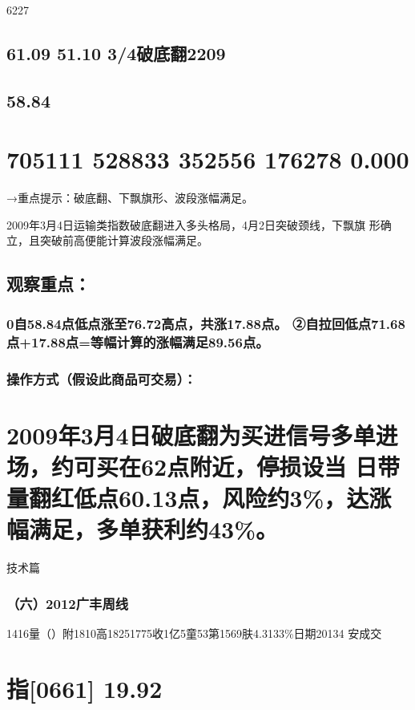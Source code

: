 \documentclass{article}
\begin{document}
6227

\subsection{61.09 51.10 3/4破底翻2209}

\subsection{58.84}

\section{705111 528833 352556 176278 0.000}

→重点提示：破底翻、下飘旗形、波段涨幅满足。

2009年3月4日运输类指数破底翻进入多头格局，4月2日突破颈线，下飘旗 形确立，且突破前高便能计算波段涨幅满足。

\subsection{观察重点：}

\subsubsection{0自58.84点低点涨至76.72高点，共涨17.88点。 ②自拉回低点71.68点+17.88点=等幅计算的涨幅满足89.56点。}

\subsubsection{操作方式（假设此商品可交易）：}

\section{2009年3月4日破底翻为买进信号多单进场，约可买在62点附近，停损设当 日带量翻红低点60.13点，风险约3\%，达涨幅满足，多单获利约43\%。}

\clearpage

技术篇

\subsubsection{（六）2012广丰周线}

1416量（）附1810高18251775收1亿5童53第1569肤4.3133\%日期20134 安成交

\section{指[0661] 19.92}
\end{document}
